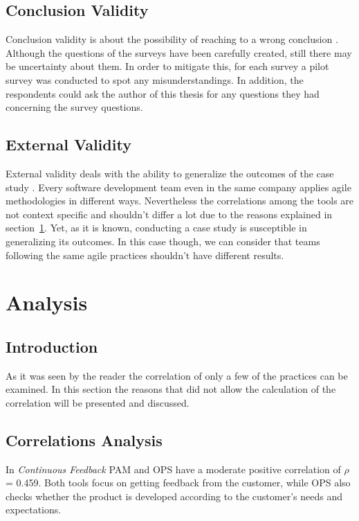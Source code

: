 \subsection{Conclusion Validity}
Conclusion validity is about the possibility of reaching to a wrong conclusion \cite{Wohlin}. Although the questions of the surveys have been carefully created, still there may be uncertainty about them. In order to mitigate this, for each survey a pilot survey was conducted to spot any misunderstandings. In addition, the respondents could ask the author of this thesis for any questions they had concerning the survey questions.

\subsection{External Validity}
External validity deals with the ability to generalize the outcomes of the case study \cite{Wohlin}. Every software development team even in the same company applies agile methodologies in different ways. Nevertheless the correlations among the tools are not context specific and shouldn’t differ a lot due to the reasons explained in section~\ref{sec:analysis}. Yet, as it is known, conducting a case study is susceptible in generalizing its outcomes. In this case though, we can consider that teams following the same agile practices shouldn’t have different results.

\section{Analysis}
\label{sec:analysis}

\subsection{Introduction}
As it was seen by the reader the correlation of only a few of the practices can be examined. In this section the reasons that did not allow the calculation of the correlation will be presented and discussed.

\subsection{Correlations Analysis}
\label{subsec:correlation_analysis}

In \textit{Continuous Feedback} PAM and OPS have a moderate positive correlation of $\rho$ = 0.459. Both tools focus on getting feedback from the customer, while OPS also checks whether the product is developed according to the customer's needs and expectations.

